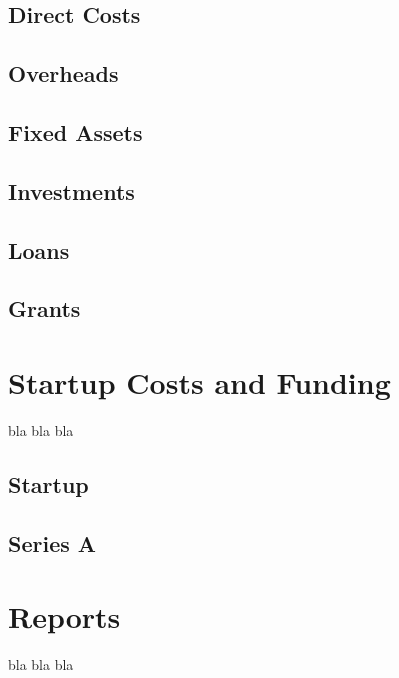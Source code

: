 \documentclass[letterpaper,10pt,openany,oneside,english]{sphinxmanual}
\begin{document}
\section{Direct Costs}
\label{\detokenize{financial-projections:direct-costs}}

\section{Overheads}
\label{\detokenize{financial-projections:overheads}}

\section{Fixed Assets}
\label{\detokenize{financial-projections:fixed-assets}}

\section{Investments}
\label{\detokenize{financial-projections:investments}}

\section{Loans}
\label{\detokenize{financial-projections:loans}}

\section{Grants}
\label{\detokenize{financial-projections:grants}}

\chapter{Startup Costs and Funding}
\label{\detokenize{startup-funding:startup-costs-and-funding}}\label{\detokenize{startup-funding::doc}}
bla bla bla


\section{Startup}
\label{\detokenize{startup-funding:startup}}

\section{Series A}
\label{\detokenize{startup-funding:series-a}}

\chapter{Reports}
\label{\detokenize{reports:reports}}\label{\detokenize{reports::doc}}
bla bla bla
\end{document}
